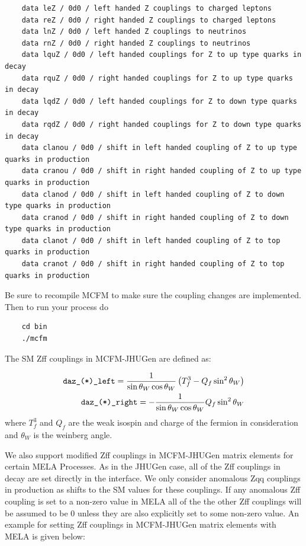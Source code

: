 \documentclass[aps,superscriptaddress,nofootinbib]{revtex4}
\begin{document}
\begin{verbatim}
    data leZ / 0d0 / left handed Z couplings to charged leptons
    data reZ / 0d0 / right handed Z couplings to charged leptons 
    data lnZ / 0d0 / left handed Z couplings to neutrinos 
    data rnZ / 0d0 / right handed Z couplings to neutrinos
    data lquZ / 0d0 / left handed couplings for Z to up type quarks in decay 
    data rquZ / 0d0 / right handed couplings for Z to up type quarks in decay 
    data lqdZ / 0d0 / left handed couplings for Z to down type quarks in decay
    data rqdZ / 0d0 / right handed couplings for Z to down type quarks in decay
    data clanou / 0d0 / shift in left handed coupling of Z to up type quarks in production  
    data cranou / 0d0 / shift in right handed coupling of Z to up type quarks in production 
    data clanod / 0d0 / shift in left handed coupling of Z to down type quarks in production  
    data cranod / 0d0 / shift in right handed coupling of Z to down type quarks in production  
    data clanot / 0d0 / shift in left handed coupling of Z to top quarks in production
    data cranot / 0d0 / shift in right handed coupling of Z to top quarks in production
\end{verbatim}
Be sure to recompile MCFM to make sure the coupling changes are implemented. Then to run your process do 
\begin{verbatim}
    cd bin 
    ./mcfm
\end{verbatim}
The SM Zff couplings in MCFM-JHUGen are defined as:

\begin{eqnarray*}
  \verb|daz_(*)_left| = \frac{1}{\sin\theta_{W}\cos\theta_{W}} \left(T^{3}_{f}-Q_{f} \sin^2 \theta_{W}\right) \\
  \verb|daz_(*)_right| = -\frac{1}{\sin\theta_{W}\cos\theta_{W}} Q_{f} \sin^2 \theta_{W}
\end{eqnarray*}
where $T^{3}_{f}$ and $Q_{f}$ are the weak isospin and charge of the fermion in consideration and $\theta_{W}$ is the weinberg angle.

We also support modified Zff couplings in MCFM-JHUGen matrix elements for certain MELA Processes. As in the JHUGen case, all of the Zff couplings in decay 
are set directly in the interface. We only consider anomalous Zqq couplings in production as shifts to the SM values for these couplings. If any anomalous Zff coupling is set to a non-zero value in MELA all of the the other Zff couplings will be assumed to be 0
unless they are also explicitly set to some non-zero value. An example for setting Zff couplings in MCFM-JHUGen matrix elements with MELA is given below:
\end{document}
